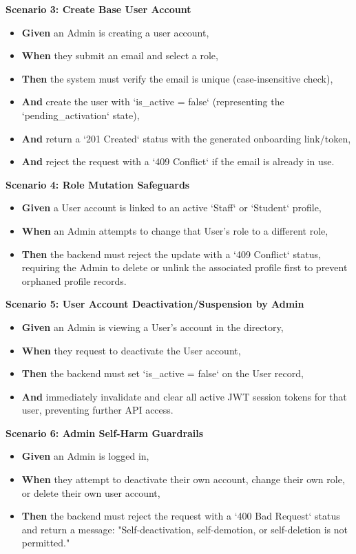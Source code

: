 \noindent\textbf{Scenario 3: Create Base User Account}\\
\begin{itemize}
  \item \textbf{Given} an Admin is creating a user account,
  \item \textbf{When} they submit an email and select a role,
  \item \textbf{Then} the system must verify the email is unique (case-insensitive check),
  \item \textbf{And} create the user with `is\_active = false` (representing the `pending\_activation` state),
  \item \textbf{And} return a `201 Created` status with the generated onboarding link/token,
  \item \textbf{And} reject the request with a `409 Conflict` if the email is already in use.
\end{itemize}


\noindent\textbf{Scenario 4: Role Mutation Safeguards}\\
\begin{itemize}
  \item \textbf{Given} a User account is linked to an active `Staff` or `Student` profile,
  \item \textbf{When} an Admin attempts to change that User's role to a different role,
  \item \textbf{Then} the backend must reject the update with a `409 Conflict` status, requiring the Admin to delete or unlink the associated profile first to prevent orphaned profile records.
\end{itemize}


\noindent\textbf{Scenario 5: User Account Deactivation/Suspension by Admin}\\
\begin{itemize}
  \item \textbf{Given} an Admin is viewing a User's account in the directory,
  \item \textbf{When} they request to deactivate the User account,
  \item \textbf{Then} the backend must set `is\_active = false` on the User record,
  \item \textbf{And} immediately invalidate and clear all active JWT session tokens for that user, preventing further API access.
\end{itemize}


\noindent\textbf{Scenario 6: Admin Self-Harm Guardrails}\\
\begin{itemize}
  \item \textbf{Given} an Admin is logged in,
  \item \textbf{When} they attempt to deactivate their own account, change their own role, or delete their own user account,
  \item \textbf{Then} the backend must reject the request with a `400 Bad Request` status and return a message: "Self-deactivation, self-demotion, or self-deletion is not permitted."
\end{itemize}


